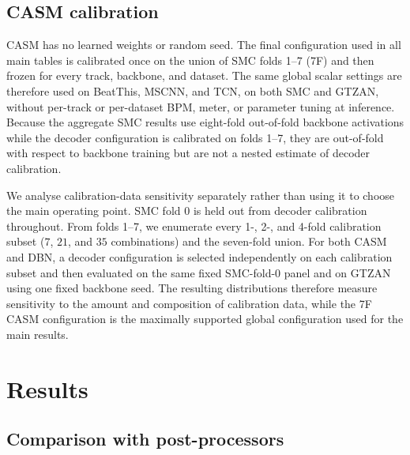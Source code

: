 \documentclass{article}
\begin{document}
\subsection{CASM calibration}
CASM has no learned weights or random seed. The final configuration used in all main tables is calibrated once on the union of SMC folds 1--7 (7F) and then frozen for every track, backbone, and dataset. The same global scalar settings are therefore used on BeatThis, MSCNN, and TCN, on both SMC and GTZAN, without per-track or per-dataset BPM, meter, or parameter tuning at inference. Because the aggregate SMC results use eight-fold out-of-fold backbone activations while the decoder configuration is calibrated on folds 1--7, they are out-of-fold with respect to backbone training but are not a nested estimate of decoder calibration.

We analyse calibration-data sensitivity separately rather than using it to choose the main operating point. SMC fold 0 is held out from decoder calibration throughout. From folds 1--7, we enumerate every 1-, 2-, and 4-fold calibration subset ($7$, $21$, and $35$ combinations) and the seven-fold union. For both CASM and DBN, a decoder configuration is selected independently on each calibration subset and then evaluated on the same fixed SMC-fold-0 panel and on GTZAN using one fixed backbone seed. The resulting distributions therefore measure sensitivity to the amount and composition of calibration data, while the 7F CASM configuration is the maximally supported global configuration used for the main results.
\section{Results}
\label{sec:results}

\subsection{Comparison with post-processors}
\end{document}
